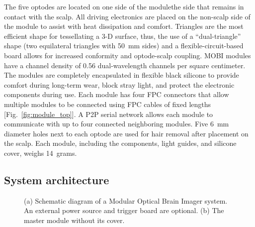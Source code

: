 The five optodes are located on one side of the module\textemdash the side that remains in contact with the scalp. All driving electronics are placed on the non-scalp side of the module to assist with heat dissipation and comfort. Triangles are the most efficient shape for tessellating a 3-D surface, thus, the use of a ``dual-triangle'' shape (two equilateral triangles with 50~mm sides) and a flexible-circuit-based board allows for increased conformity and optode-scalp coupling. \ac{MOBI} modules have a channel density of 0.56 dual-wavelength channels per square centimeter. The modules are completely encapsulated in flexible black silicone to provide comfort during long-term wear, block stray light, and protect the electronic components during use. Each module has four \ac{FPC} connectors that allow multiple modules to be connected using \ac{FPC} cables of fixed lengths [Fig.~\ref{fig:module_top}]. A \ac{P2P} serial network allows each module to communicate with up to four connected neighboring modules. Five 6~mm diameter holes next to each optode are used for hair removal after placement on the scalp. Each module, including the components, light guides, and silicone cover, weighs 14~grams. 

\subsection{System architecture}
\begin{figure}
	\begin{center}
	\end{center}
	\caption{(a) Schematic diagram of a Modular Optical Brain Imager system. An external power source and trigger board are optional. (b) The master module without its cover.} 
	\label{fig:architecture}
\end{figure} 

